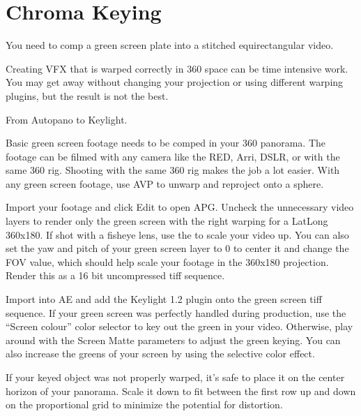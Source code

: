 \section{Chroma Keying}
\pagecolor{white}
\label{chap:53}
\begin{fullwidth}

\problem

{\large You need to comp a green screen plate into a stitched equirectangular video. \par}

Creating VFX that is warped correctly in 360 space can be time intensive work. You may get away without changing your projection or using different warping plugins, but the result is not the best. 

\solution

{\large From Autopano to Keylight. \par}

Basic green screen footage needs to be comped in your 360 panorama. The footage can be filmed with any camera like the RED, Arri, DSLR, or with the same 360 rig. Shooting with the same 360 rig makes the job a lot easier. With any green screen footage, use AVP to unwarp and reproject onto a sphere. 


Import your footage and click Edit to open APG. Uncheck the unnecessary video layers to render only the green screen with the right warping for a LatLong 360x180. If shot with a fisheye lens, use the \textbf{} to scale your video up. You can also set the yaw and pitch of your green screen layer to 0 to center it and change the FOV value, which should help scale your footage in the 360x180 projection. Render this as a 16 bit uncompressed tiff sequence.


Import into AE and add the Keylight 1.2 plugin onto the green screen tiff sequence. If your green screen was perfectly handled during production, use the “Screen colour” color selector to key out the green in your video. Otherwise, play around with the Screen Matte parameters to adjust the green keying. You can also increase the greens of your screen by using the selective color effect.

\clearpage
If your keyed object was not properly warped, it's safe to place it on the center horizon of your panorama. Scale it down to fit between the first row up and down on the proportional grid to minimize the potential for distortion.


\end{fullwidth}
